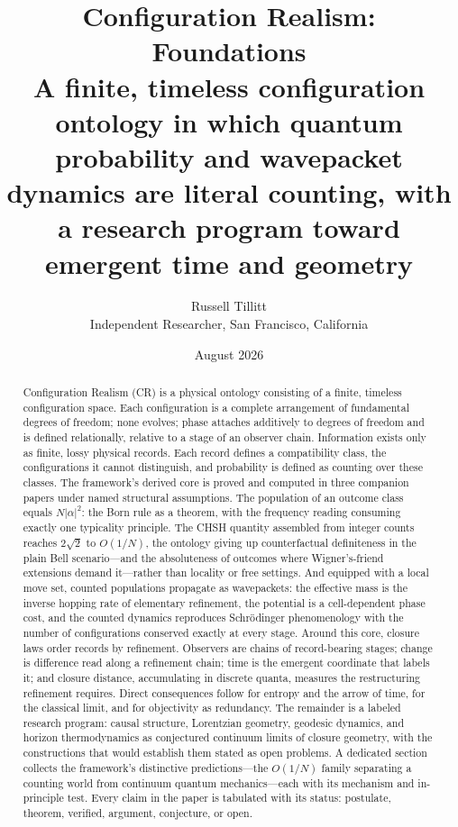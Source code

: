 \documentclass[11pt]{article}
\title{Configuration Realism: Foundations\\[0.5em]
\large A finite, timeless configuration ontology in which quantum probability and wavepacket\\ dynamics are literal counting, with a research program toward emergent time and geometry}
\author{Russell Tillitt\\ \small Independent Researcher, San Francisco, California}
\date{August 2026}
\theoremstyle{definition}
\theoremstyle{remark}
\begin{document}
\maketitle

\begin{abstract}
Configuration Realism (CR) is a physical ontology consisting of a finite, timeless configuration space. Each configuration is a complete arrangement of fundamental degrees of freedom; none evolves; phase attaches additively to degrees of freedom and is defined relationally, relative to a stage of an observer chain. Information exists only as finite, lossy physical records. Each record defines a compatibility class, the configurations it cannot distinguish, and probability is defined as counting over these classes. The framework's derived core is proved and computed in three companion papers under named structural assumptions. The population of an outcome class equals $N|\alpha|^2$: the Born rule as a theorem, with the frequency reading consuming exactly one typicality principle. The CHSH quantity assembled from integer counts reaches $2\sqrt{2}$ to $O(1/N)$, the ontology giving up counterfactual definiteness in the plain Bell scenario---and the absoluteness of outcomes where Wigner's-friend extensions demand it---rather than locality or free settings. And equipped with a local move set, counted populations propagate as wavepackets: the effective mass is the inverse hopping rate of elementary refinement, the potential is a cell-dependent phase cost, and the counted dynamics reproduces Schr\"odinger phenomenology with the number of configurations conserved exactly at every stage. Around this core, closure laws order records by refinement. Observers are chains of record-bearing stages; change is difference read along a refinement chain; time is the emergent coordinate that labels it; and closure distance, accumulating in discrete quanta, measures the restructuring refinement requires. Direct consequences follow for entropy and the arrow of time, for the classical limit, and for objectivity as redundancy. The remainder is a labeled research program: causal structure, Lorentzian geometry, geodesic dynamics, and horizon thermodynamics as conjectured continuum limits of closure geometry, with the constructions that would establish them stated as open problems. A dedicated section collects the framework's distinctive predictions---the $O(1/N)$ family separating a counting world from continuum quantum mechanics---each with its mechanism and in-principle test. Every claim in the paper is tabulated with its status: postulate, theorem, verified, argument, conjecture, or open.
\end{abstract}
\end{document}
